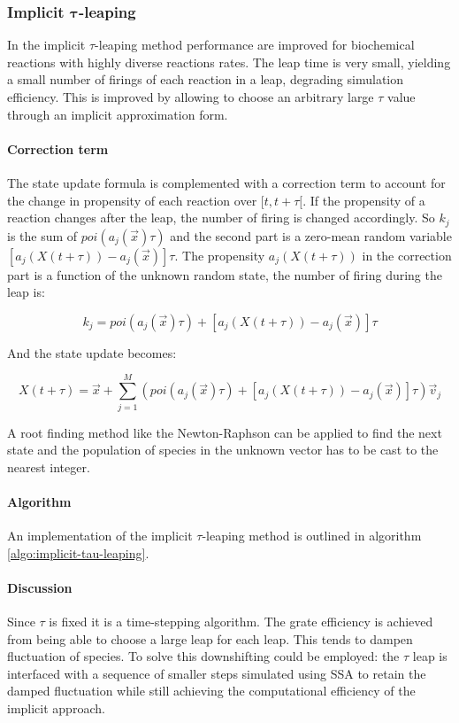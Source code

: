     \subsubsection{Implicit $\mathbf{\tau}$-leaping}
    In the implicit $\tau$-leaping method performance are improved for biochemical reactions with highly diverse reactions rates.
    The leap time is very small, yielding a small number of firings of each reaction in a leap, degrading simulation efficiency.
    This is improved by allowing to choose an arbitrary large $\tau$ value through an implicit approximation form.

      \paragraph{Correction term}
      The state update formula is complemented with a correction term to account for the change in propensity of each reaction over $[t,t+\tau[$.
      If the propensity of a reaction changes after the leap, the number of firing is changed accordingly.
      So $k_j$ is the sum of $poi(a_j(\vec{x})\tau)$ and the second part is a zero-mean random variable $[a_j(X(t+\tau))-a_j(\vec{x})]\tau$.
      The propensity $a_j(X(t+\tau))$ in the correction part is a function of the unknown random state, the number of firing during the leap is:

      $$k_j = poi(a_j(\vec{x})\tau) + [a_j(X(t+\tau))-a_j(\vec{x})]\tau$$

      And the state update becomes:

      $$X(t+\tau) = \vec{x} + \sum\limits_{j=1}^M\left(poi(a_j(\vec{x})\tau) + [a_j(X(t+\tau))-a_j(\vec{x})]\tau\right)\vec{v}_j$$

      A root finding method like the Newton-Raphson can be applied to find the next state and the population of species in the unknown vector has to be cast to the nearest integer.

      \paragraph{Algorithm}
      An implementation of the implicit $\tau$-leaping method is outlined in algorithm \ref{algo:implicit-tau-leaping}.

      

      \paragraph{Discussion}
      Since $\tau$ is fixed it is a time-stepping algorithm.
      The grate efficiency is achieved from being able to choose a large leap for each leap.
      This tends to dampen fluctuation of species.
      To solve this downshifting could be employed: the $\tau$ leap is interfaced with a sequence of smaller steps simulated using SSA to retain the damped fluctuation while still  achieving the computational efficiency of the implicit approach.

